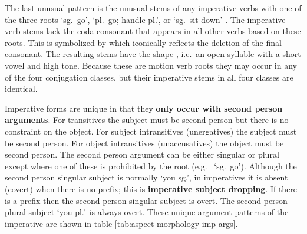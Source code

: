 \begin{multicols}{2}
The last unusual pattern is the unusual stems of any imperative verbs with one of the three roots  ‘sg.\ go’,  ‘pl.\ go; handle pl.’, or  ‘sg.\ sit down’ \parencites[49]{story:1966}[154–155]{crippen:2019}.
The imperative verb stems lack the coda consonant that appears in all other verbs based on these roots.
This is symbolized by  which iconically reflects the deletion of the final consonant.
The resulting stems have the shape , i.e.\ an open syllable with a short vowel and high tone.
Because these are motion verb roots they may occur in any of the four conjugation classes, but their imperative stems in all four classes are identical.

Imperative forms are unique in that they \textbf{only occur with second person arguments}.
For transitives the subject must be second person but there is no constraint on the object.
For subject intransitives (unergatives) the subject must be second person.
For object intransitives (unaccusatives) the object must be second person.
The second person argument can be either singular or plural except where one of these is prohibited by the root (e.g.\  ‘sg.\ go’).
Although the second person singular subject is normally  ‘you sg.’, in imperatives it is absent (covert) when there is no  prefix; this is \textbf{imperative subject dropping}.
If there is a  prefix then the second person singular subject  is overt.
The second person plural subject  ‘you pl.’\ is always overt.
These unique argument patterns of the imperative are shown in table \ref{tab:aspect-morphology-imp-args}.
\end{multicols}

